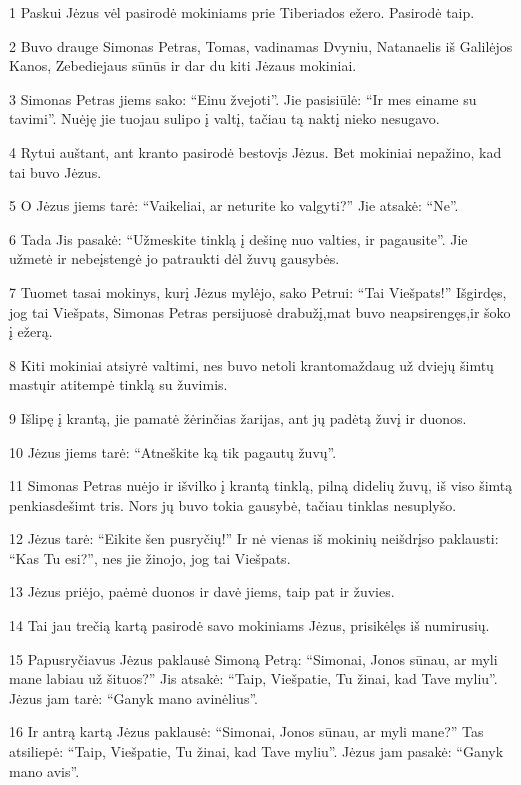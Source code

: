 \par 1 Paskui Jėzus vėl pasirodė mokiniams prie Tiberiados ežero. Pasirodė taip. 
\par 2 Buvo drauge Simonas Petras, Tomas, vadinamas Dvyniu, Natanaelis iš Galilėjos Kanos, Zebediejaus sūnūs ir dar du kiti Jėzaus mokiniai. 
\par 3 Simonas Petras jiems sako: “Einu žvejoti”. Jie pasisiūlė: “Ir mes einame su tavimi”. Nuėję jie tuojau sulipo į valtį, tačiau tą naktį nieko nesugavo. 
\par 4 Rytui auštant, ant kranto pasirodė bestovįs Jėzus. Bet mokiniai nepažino, kad tai buvo Jėzus. 
\par 5 O Jėzus jiems tarė: “Vaikeliai, ar neturite ko valgyti?” Jie atsakė: “Ne”. 
\par 6 Tada Jis pasakė: “Užmeskite tinklą į dešinę nuo valties, ir pagausite”. Jie užmetė ir nebeįstengė jo patraukti dėl žuvų gausybės. 
\par 7 Tuomet tasai mokinys, kurį Jėzus mylėjo, sako Petrui: “Tai Viešpats!” Išgirdęs, jog tai Viešpats, Simonas Petras persijuosė drabužį,­mat buvo neapsirengęs,­ir šoko į ežerą. 
\par 8 Kiti mokiniai atsiyrė valtimi, nes buvo netoli kranto­maždaug už dviejų šimtų mastų­ir atitempė tinklą su žuvimis. 
\par 9 Išlipę į krantą, jie pamatė žėrinčias žarijas, ant jų padėtą žuvį ir duonos. 
\par 10 Jėzus jiems tarė: “Atneškite ką tik pagautų žuvų”. 
\par 11 Simonas Petras nuėjo ir išvilko į krantą tinklą, pilną didelių žuvų, iš viso šimtą penkiasdešimt tris. Nors jų buvo tokia gausybė, tačiau tinklas nesuplyšo. 
\par 12 Jėzus tarė: “Eikite šen pusryčių!” Ir nė vienas iš mokinių neišdrįso paklausti: “Kas Tu esi?”, nes jie žinojo, jog tai Viešpats. 
\par 13 Jėzus priėjo, paėmė duonos ir davė jiems, taip pat ir žuvies. 
\par 14 Tai jau trečią kartą pasirodė savo mokiniams Jėzus, prisikėlęs iš numirusių. 
\par 15 Papusryčiavus Jėzus paklausė Simoną Petrą: “Simonai, Jonos sūnau, ar myli mane labiau už šituos?” Jis atsakė: “Taip, Viešpatie, Tu žinai, kad Tave myliu”. Jėzus jam tarė: “Ganyk mano avinėlius”. 
\par 16 Ir antrą kartą Jėzus paklausė: “Simonai, Jonos sūnau, ar myli mane?” Tas atsiliepė: “Taip, Viešpatie, Tu žinai, kad Tave myliu”. Jėzus jam pasakė: “Ganyk mano avis”. 
